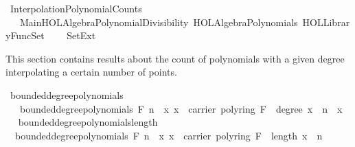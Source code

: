 %
\begin{isabellebody}%
%
%
\isadelimdocument
%
\endisadelimdocument
%
\isatagdocument
%
\isamarkuptrue%
%
\endisatagdocument
{\isafolddocument}%
%
\isadelimdocument
%
\endisadelimdocument
%
\isadelimtheory
%
\endisadelimtheory
%
\isatagtheory
{}\isamarkupfalse%
\ Interpolation{\isacharunderscore}{\kern0pt}Polynomial{\isacharunderscore}{\kern0pt}Counts\isanewline
\ \ \ Main{\isachardoublequoteopen}HOL{\isacharminus}{\kern0pt}Algebra{\isachardot}{\kern0pt}Polynomial{\isacharunderscore}{\kern0pt}Divisibility{\isachardoublequoteclose}\ {\isachardoublequoteopen}HOL{\isacharminus}{\kern0pt}Algebra{\isachardot}{\kern0pt}Polynomials{\isachardoublequoteclose}\ {\isachardoublequoteopen}HOL{\isacharminus}{\kern0pt}Library{\isachardot}{\kern0pt}FuncSet{\isachardoublequoteclose}\isanewline
\ \ \ \ Set{\isacharunderscore}{\kern0pt}Ext\ \isanewline
{}%
\endisatagtheory
{\isafoldtheory}%
%
\isadelimtheory
%
\endisadelimtheory
%
\begin{isamarkuptext}%
This section contains results about the count of polynomials with a given degree interpolating
a certain number of points.%
\end{isamarkuptext}\isamarkuptrue%
\isamarkupfalse%
\ bounded{\isacharunderscore}{\kern0pt}degree{\isacharunderscore}{\kern0pt}polynomials\isanewline
\ \ \ {\isachardoublequoteopen}bounded{\isacharunderscore}{\kern0pt}degree{\isacharunderscore}{\kern0pt}polynomials\ F\ n\ {\isacharequal}{\kern0pt}\ {\isacharbraceleft}{\kern0pt}x{\isachardot}{\kern0pt}\ x\ {\isasymin}\ carrier\ {\isacharparenleft}{\kern0pt}poly{\isacharunderscore}{\kern0pt}ring\ F{\isacharparenright}{\kern0pt}\ {\isasymand}\ {\isacharparenleft}{\kern0pt}degree\ x\ {\isacharless}{\kern0pt}\ n\ {\isasymor}\ x\ {\isacharequal}{\kern0pt}\ {\isacharbrackleft}{\kern0pt}{\isacharbrackright}{\kern0pt}{\isacharparenright}{\kern0pt}{\isacharbraceright}{\kern0pt}{\isachardoublequoteclose}\isanewline
\isanewline
{}\isamarkupfalse%
\ bounded{\isacharunderscore}{\kern0pt}degree{\isacharunderscore}{\kern0pt}polynomials{\isacharunderscore}{\kern0pt}length{\isacharcolon}{\kern0pt}\isanewline
\ \ {\isachardoublequoteopen}bounded{\isacharunderscore}{\kern0pt}degree{\isacharunderscore}{\kern0pt}polynomials\ F\ n\ {\isacharequal}{\kern0pt}\ {\isacharbraceleft}{\kern0pt}x{\isachardot}{\kern0pt}\ x\ {\isasymin}\ carrier\ {\isacharparenleft}{\kern0pt}poly{\isacharunderscore}{\kern0pt}ring\ F{\isacharparenright}{\kern0pt}\ {\isasymand}\ length\ x\ {\isasymle}\ n{\isacharbraceright}{\kern0pt}{\isachardoublequoteclose}\isanewline

\end{isabellebody}
